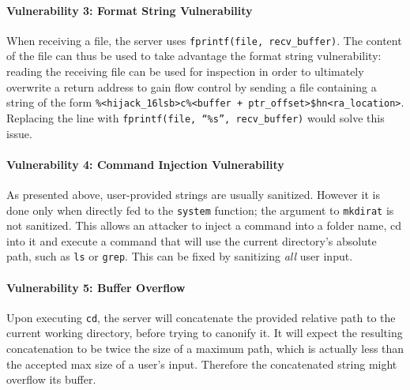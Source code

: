 \documentclass[8pt, oneside, letterpaper]{book}
\renewcommand*{\[}{[\![}
\renewcommand*{\]}{]\!]}
\begin{document}
\paragraph {Vulnerability 3: Format String Vulnerability}
When receiving a file, the server uses \texttt{fprintf(file, recv\_buffer)}. The
content of the file can thus be used to take advantage the format string
vulnerability: reading the receiving file can be used for inspection in order to
ultimately overwrite a return address to gain flow control by sending a file
containing a string of the form
\texttt{\%<hijack\_16lsb>c\%<buffer + ptr\_offset>\$hn<ra\_location>}. Replacing
the line with \texttt{fprintf(file, ``\%s'', recv\_buffer)} would solve this issue.

\paragraph {Vulnerability 4: Command Injection Vulnerability}
As presented above, user-provided strings are usually sanitized. However it is
done only when directly fed to the \texttt{system} function; the argument to
\texttt{mkdirat} is not sanitized. This allows an attacker to inject a command
into a folder name, cd into it and execute a command that will use the current
directory's absolute path, such as \texttt{ls} or \texttt{grep}. This can be
fixed by sanitizing \emph{all} user input.

\paragraph {Vulnerability 5: Buffer Overflow}
Upon executing \texttt{cd}, the server will concatenate the provided relative
path to the current working directory, before trying to canonify it. It will
expect the resulting concatenation to be twice the size of a maximum path, which
is actually less than the accepted max size of a user's input. Therefore the
concatenated string might overflow its buffer.
\end{document}
